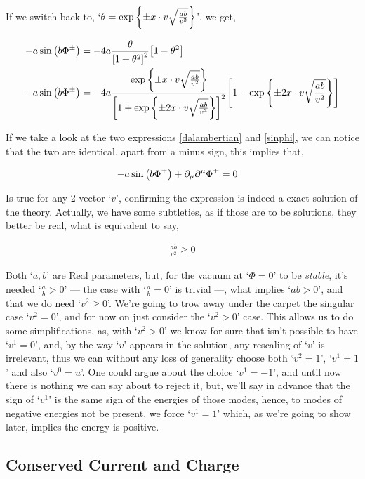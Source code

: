 If we switch back to, `$\theta=\exp\qty{\pm x\cdot v\sqrt{\frac{ab}{v^2}}}$', we get,

\begin{align}
    -a\sin\qty(b\Phi^\pm)&=-4a\frac{\theta}{\qty[1+\theta^2]^2}\qty[1-\theta^2]\nonumber\\
    -a\sin\qty(b\Phi^\pm)&=-4a\frac{\exp\qty{\pm x\cdot v\sqrt{\frac{ab}{v^2}}}}
        {\qty[1+\exp\qty{\pm 2x\cdot v\sqrt{\frac{ab}{v^2}}}]^2}
    \qty[1-\exp\qty{\pm 2x\cdot v\sqrt{\frac{ab}{v^2}}}]\label{sinphi}
\end{align}

If we take a look at the two expressions \ref{dalambertian} and \ref{sinphi}, we can 
notice that the two are identical, apart from a minus sign, this implies that,

\begin{align}
    -a\sin\qty(b\Phi^\pm)+\partial_\mu\partial^\mu\Phi^\pm&=0\nonumber
\end{align}

Is true for any 2-vector `$v$', confirming the expression is indeed a exact solution of the theory. Actually, 
we have some subtleties, as if those are to be solutions, they better be real, what is equivalent to say,

\begin{align}
    \frac{ab}{v^2}\geq 0\nonumber
\end{align}

Both `$a,b$' are Real parameters, but, for the vacuum at `$\Phi=0$' to be \textit{stable}, it's needed `$\frac ab>0$' 
--- the case with `$\frac ab=0$' is trivial ---, what implies `$ab>0$', and that we do need `$v^2\geq 0$'. 
We're going to trow away under the carpet the singular case `$v^2=0$', and for now on just consider the 
`$v^2>0$' case. This allows us to do some simplifications, as, with `$v^2>0$' we know for sure that isn't 
possible to have `$v^1=0$', and, by the way `$v$' appears in the solution, any rescaling of `$v$' is irrelevant, 
thus we can without any loss of generality choose both `$v^2=1$', `$v^1=1$' and also `$v^0=u$'. One could argue about the choice 
`$v^1=-1$', and until now there is nothing we can say about to reject it, but, we'll say in advance that the sign of 
`$v^1$' is the same sign of the energies of those modes, hence, to modes of negative energies not be present, we force 
`$v^1=1$' which, as we're going to show later, implies the energy is positive.

\subsection{Conserved Current and Charge}

